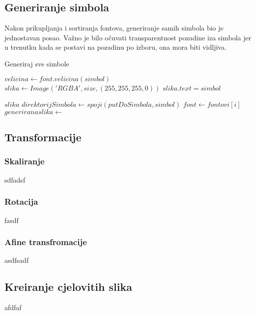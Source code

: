 \subsection{Generiranje simbola}
Nakon prikupljanja i sortiranja fontova, generiranje samih simbola bio je jednostavan posao.
Važno je bilo očuvati transparentnost pozadine iza simbola jer u trenutku kada se postavi na pozadinu po izboru, ona mora biti vidljiva.
\begin{algorithm}
\caption{Generiraj sve simbole}
\begin{algorithmic}[1]
		\State $velicina \gets font.velicina(simbol)$
		\State $slika \gets Image('RGBA', size, (255, 255, 255, 0))$
		\State $slika.text = simbol$
		
		\Return $slika$
	\EndFunction
			\For{\texttt{i in [0, brojFontova>}}
				\State $direktorijSimbola \leftarrow spoji(putDoSimbola, simbol)$
					\State {}
				\EndIf
				\State $font \leftarrow fontovi[i]$
				\State $generirana slika \gets$ 
				\State {}
			\EndFor
		\EndFor
	\EndFunction
\end{algorithmic}
\end{algorithm}

\subsection{Transformacije}
\subsubsection{Skaliranje}
sdfadsf
\subsubsection{Rotacija}
fasdf
\subsubsection{Afine transfromacije}
asdfsadf
\subsection{Kreiranje cjelovitih slika}
afdfaf
